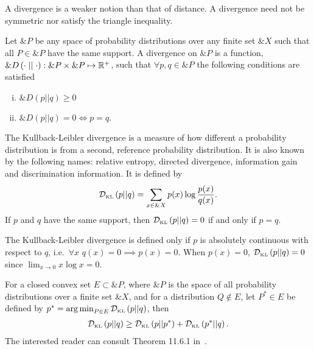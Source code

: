 \begin{remark}
  A divergence is a weaker notion than that of distance. A divergence
  need not be symmetric nor satisfy the triangle inequality.
\end{remark}

\begin{definition}
  Let $\&P$ be any space of probability distributions over any finite
  set $\&X$ such that all $P \in \&P$ have the same support. A
  \textnormal{\sffamily divergence} on $\&P$ is a function,
  $\&D\left( \cdot \mid\mid \cdot \right): \&P \times \&P \mapsto
  \mathbb{R}^+$, such that $\forall p, q \in \&P$ the following conditions are
  satisfied
  \begin{enumerate}[(i)]
  \item $\&D(p||q) \geq 0$
  \item $\&D(p||q) = 0 \iff p = q$.
  \end{enumerate}
\end{definition}

\begin{definition}%
  \label{def:kl-divergence}
  The \textnormal{\sffamily Kullback-Leibler divergence} is a measure of how
  different a probability distribution is from a second, reference probability
  distribution. It is also known by the following names: \textnormal{\sffamily
    relative entropy}, \textnormal{\sffamily directed divergence},
  \textnormal{\sffamily information gain} and \textnormal{\sffamily
    discrimination information}. It is defined by
  \begin{align}
    \label{eq:KL}
    \mathcal{D}_{\text{\tiny KL}}\left( p \middle| \middle| q \right) = \sum_{x \in \&X} p(x) \log{p(x) \over q(x)}.
  \end{align}
  If $p$ and $q$ have the same support, then $\mathcal{D}_{\text{\tiny KL}}\left( p \middle| \middle| q \right) = 0$ if and
  only if $p = q$.
\end{definition}

\begin{remark}
  The Kullback-Leibler divergence is defined only if $p$ is absolutely
  continuous with respect to $q$, i.e.\ $\forall x$
  $q(x) = 0 \implies p(x) = 0$.  When $p(x) = 0$, $\mathcal{D}_{\text{\tiny KL}}\left( p \middle| \middle| q \right) = 0$
  since $\lim_{x \to 0} x\log{x} = 0$.
\end{remark}

\begin{theorem}
  For a closed convex set $E \subset \&P$, where $\&P$ is the space of
  all probability distributions over a finite set $\&X$, and for a
  distribution $Q \not \in E$, let $P^* \in E$ be defined by
  $p^* = \operatorname*{arg\,min}_{P \in E} \mathcal{D}_{\text{\tiny KL}}\left( p \middle| \middle| q \right)$, then
  \begin{align}
   \mathcal{D}_{\text{\tiny KL}}\left( p \middle| \middle| q \right) \geq \mathcal{D}_{\text{\tiny KL}}\left( p \middle| \middle| p^* \right) + \mathcal{D}_{\text{\tiny KL}}\left( p^* \middle| \middle| q \right).
  \end{align}
  The interested reader can consult Theorem 11.6.1 in~\cite{ref:cover-thomas}.
\end{theorem}

